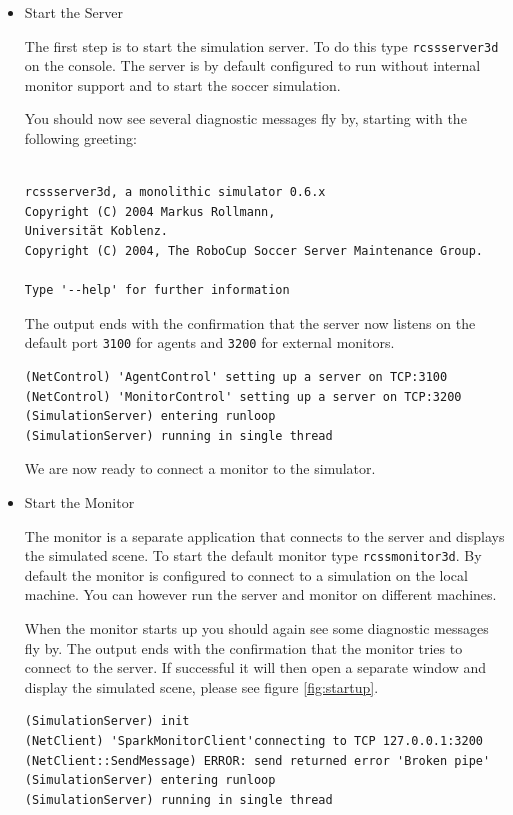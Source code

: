 \begin{itemize}
\item{Start the Server}

The first step is to start the simulation server. To do this type
\texttt{rcssserver3d} on the console. The server is by default configured
to run without internal monitor support and to start the soccer
simulation. 

You should now see several diagnostic messages fly by, starting with
the following greeting:

\begin{verbatim}

rcssserver3d, a monolithic simulator 0.6.x
Copyright (C) 2004 Markus Rollmann,
Universität Koblenz.
Copyright (C) 2004, The RoboCup Soccer Server Maintenance Group.

Type '--help' for further information

\end{verbatim}

The output ends with the confirmation that the server now listens on
the default port \texttt{3100} for agents and \texttt{3200} for
external monitors.

\begin{verbatim}
(NetControl) 'AgentControl' setting up a server on TCP:3100
(NetControl) 'MonitorControl' setting up a server on TCP:3200
(SimulationServer) entering runloop
(SimulationServer) running in single thread
\end{verbatim}

We are now ready to connect a monitor to the simulator.


\item{Start the Monitor}

The monitor is a separate application that connects to the server and
displays the simulated scene. To start the default monitor type
\texttt{rcssmonitor3d}. By default the monitor is configured to connect to a simulation 
on the local machine. You can however run the server and monitor on
different machines.

When the monitor starts up you should again see some diagnostic
messages fly by. The output ends with the confirmation that the
monitor tries to connect to the server. If successful it will then open
a separate window and display the simulated scene, please see figure
\ref{fig:startup}.

\begin{verbatim}
(SimulationServer) init
(NetClient) 'SparkMonitorClient'connecting to TCP 127.0.0.1:3200
(NetClient::SendMessage) ERROR: send returned error 'Broken pipe'
(SimulationServer) entering runloop
(SimulationServer) running in single thread
\end{verbatim}


\end{itemize}
